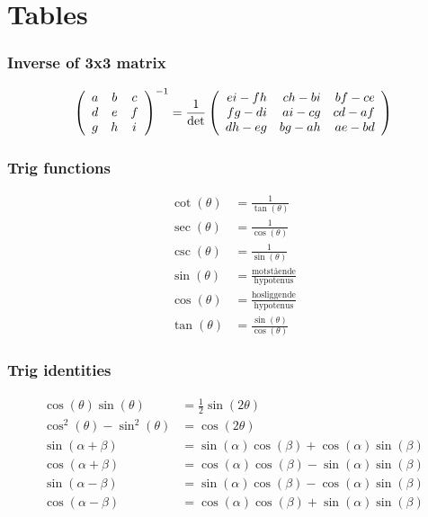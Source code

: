 \part{Tables}

\section{Inverse of 3x3 matrix}
\begin{equation}
\left(\begin{array}{ccc}
    a & b & c\\
    d & e & f\\
    g & h &i
\end{array}\right)^{-1}
=
{\frac{1}{\rm{det}}}
\left(\begin{array}{rrr}
    e i - f h & c h - b i & b f - c e\\
    f g - d i & a i - c g & c d - a f\\
    d h - e g & b g - a h & a e - b d
\end{array}\right)
\end{equation}


\section{Trig functions}
\begin{align}
    \cot(\theta) &= \frac{1}{\tan(\theta)}\\
    \sec(\theta) &= \frac{1}{\cos(\theta)}\\
    \csc(\theta) &= \frac{1}{\sin(\theta)}\\
    \sin(\theta) &= \frac{\text{motstående}}{\text{hypotenus}}\\
    \cos(\theta) &= \frac{\text{hosliggende}}{\text{hypotenus}}\\
    \tan(\theta) &= \frac{\sin(\theta)}{\cos(\theta)}
\end{align}

\section{Trig identities}
\begin{align}
    \cos(\theta)\sin(\theta) &= \frac{1}{2}\sin(2\theta)\\
    \cos^2(\theta)-\sin^2(\theta) &= \cos(2\theta)\\
    \sin(\alpha+\beta) &= \sin(\alpha)\cos(\beta) + \cos(\alpha)\sin(\beta)\\
    \cos(\alpha+\beta) &= \cos(\alpha)\cos(\beta) - \sin(\alpha)\sin(\beta)\\
    \sin(\alpha-\beta) &= \sin(\alpha)\cos(\beta) - \cos(\alpha)\sin(\beta)\\
    \cos(\alpha-\beta) &= \cos(\alpha)\cos(\beta) + \sin(\alpha)\sin(\beta)
\end{align}
